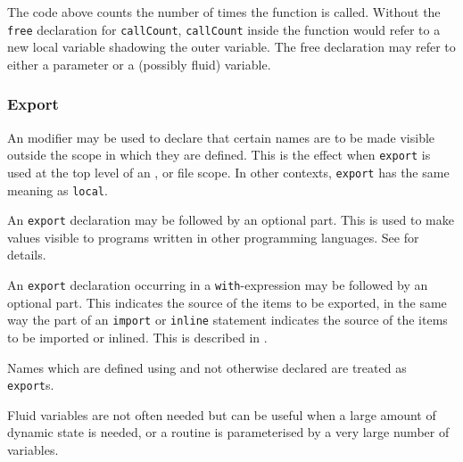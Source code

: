 The code above counts the number of times the function  is
called. Without the \verb"free" declaration for {\tt callCount},
{\tt callCount} inside the function would refer to a new local variable
shadowing the outer variable. The free declaration may refer to either a
parameter or a (possibly fluid) variable.

\subsubsection{Export}

An  modifier may be used to declare that certain names
are to be made visible outside the scope in which they are defined.
This is the effect when \verb"export" is used at the top level of
an ,  or file scope.
In other contexts, \verb"export" has the same meaning
as \verb"local".

An {\tt export} declaration may be followed by an optional
 part.  This is used to make \asharp{} values visible
to programs written in other programming languages.
See  for details.

An {\tt export} declaration occurring in a {\tt with}-expression
may be followed by an optional  part.  This indicates
the source of the items to be exported, in the same way the
 part of an {\tt import} or {\tt inline} statement
indicates the source of the items to be imported or inlined.
This is described in  .

Names which are defined using \ttin{==} and
not otherwise declared are treated as {\tt export}s.



Fluid variables are not often needed but can be useful when a large
amount of dynamic state is needed, or a routine is parameterised by
a very large number of variables.

